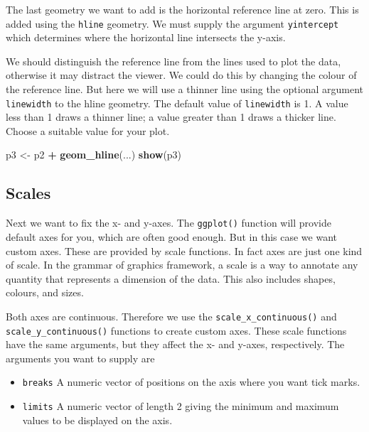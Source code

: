 \documentclass[
]{book}
\newenvironment{Shaded}{\begin{snugshade}}{\end{snugshade}}
\newcommand{\FunctionTok}[1]{\textcolor[rgb]{0.13,0.29,0.53}{\textbf{#1}}}
\newcommand{\NormalTok}[1]{#1}
\newcommand{\OtherTok}[1]{\textcolor[rgb]{0.56,0.35,0.01}{#1}}
\newcommand{\SpecialCharTok}[1]{\textcolor[rgb]{0.81,0.36,0.00}{\textbf{#1}}}
\providecommand{\tightlist}{%
  \setlength{\itemsep}{0pt}\setlength{\parskip}{0pt}}
\begin{document}
The last geometry we want to add is the horizontal reference line at zero. This is added using the \texttt{hline} geometry. We must supply the argument \texttt{yintercept} which determines where the horizontal line intersects the y-axis.

We should distinguish the reference line from the lines used to plot the data, otherwise it may distract the viewer. We could do this by changing the colour of the reference line. But here we will use a thinner line using the optional argument \texttt{linewidth} to the hline geometry. The default value of \texttt{linewidth} is 1. A value less than 1 draws a thinner line; a value greater than 1 draws a thicker line. Choose a suitable value for your plot.

\begin{Shaded}
\begin{Highlighting}[]
\NormalTok{p3 }\OtherTok{\textless{}{-}}\NormalTok{ p2 }\SpecialCharTok{+} \FunctionTok{geom\_hline}\NormalTok{(...)}
\FunctionTok{show}\NormalTok{(p3)}
\end{Highlighting}
\end{Shaded}

\subsection{Scales}\label{scales}

Next we want to fix the x- and y-axes. The \texttt{ggplot()} function will provide default axes for you, which are often good enough. But in this case we want custom axes. These are provided by scale functions. In fact axes are just one kind of scale. In the grammar of graphics framework, a scale is a way to annotate any quantity that represents a dimension of the data. This also includes shapes, colours, and sizes.

Both axes are continuous. Therefore we use the \texttt{scale\_x\_continuous()} and \texttt{scale\_y\_continuous()} functions to create custom axes. These scale functions have the same arguments, but they affect the x- and y-axes, respectively. The arguments you want to supply are

\begin{itemize}
\tightlist
\item
  \texttt{breaks} A numeric vector of positions on the axis where you want tick marks.
\item
  \texttt{limits} A numeric vector of length 2 giving the minimum and maximum values to be displayed on the axis.
\end{itemize}
\end{document}
